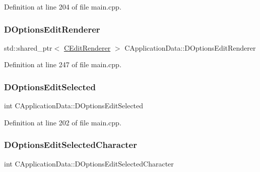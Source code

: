 Definition at line 204 of file main.\+cpp.

\hypertarget{classCApplicationData_ad445b9a4d742414d09196de7cd8a5b26}{}\label{classCApplicationData_ad445b9a4d742414d09196de7cd8a5b26} 
\subsubsection{\texorpdfstring{D\+Options\+Edit\+Renderer}{DOptionsEditRenderer}}
{\footnotesize\ttfamily std\+::shared\+\_\+ptr$<$ \hyperlink{classCEditRenderer}{C\+Edit\+Renderer} $>$ C\+Application\+Data\+::\+D\+Options\+Edit\+Renderer\hspace{0.3cm}{\ttfamily [protected]}}



Definition at line 247 of file main.\+cpp.

\hypertarget{classCApplicationData_aee4aa5eb5b89b86eb2648d0f9c7358f9}{}\label{classCApplicationData_aee4aa5eb5b89b86eb2648d0f9c7358f9} 
\subsubsection{\texorpdfstring{D\+Options\+Edit\+Selected}{DOptionsEditSelected}}
{\footnotesize\ttfamily int C\+Application\+Data\+::\+D\+Options\+Edit\+Selected\hspace{0.3cm}{\ttfamily [protected]}}



Definition at line 202 of file main.\+cpp.

\hypertarget{classCApplicationData_a921d69021fc61e51d12d8a26a5ac1a89}{}\label{classCApplicationData_a921d69021fc61e51d12d8a26a5ac1a89} 
\subsubsection{\texorpdfstring{D\+Options\+Edit\+Selected\+Character}{DOptionsEditSelectedCharacter}}
{\footnotesize\ttfamily int C\+Application\+Data\+::\+D\+Options\+Edit\+Selected\+Character\hspace{0.3cm}{\ttfamily [protected]}}



